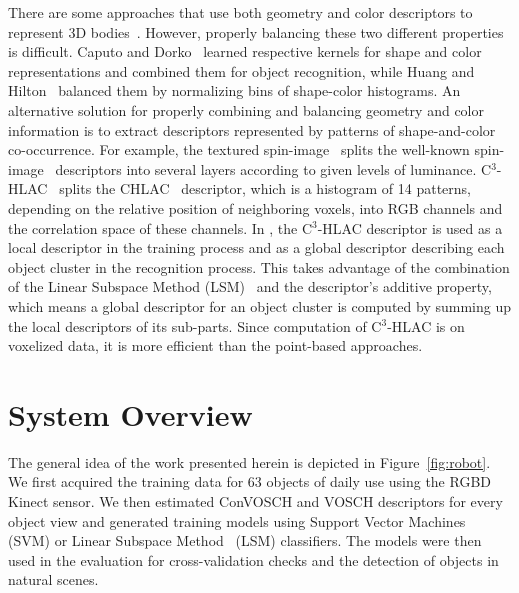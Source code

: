 \documentclass[a4paper, 10 pt, conference]{sty/ieeeconf}
\begin{document}
There are some approaches that use both geometry and color descriptors to
represent 3D bodies~\cite{park2006}. However, properly balancing these two
different properties is difficult.  Caputo and Dorko~\cite{caputo2002} learned
respective kernels for shape and color representations and combined them for
object recognition, while Huang and Hilton~\cite{huang2009} balanced them by
normalizing bins of shape-color histograms.  An alternative solution for properly combining
and balancing geometry and color information is to extract descriptors
represented by patterns of shape-and-color co-occurrence.  For example, the textured
spin-image~\cite{cortelazzo2006} splits the well-known
spin-image~\cite{Johnson_spin_images} descriptors into several layers
according to given levels of luminance. C$^3$-HLAC~\cite{kanezaki2011icra} 
splits the CHLAC~\cite{kobayashi2004} descriptor, which is a histogram of 14 patterns, 
depending on the relative position of neighboring voxels, into RGB channels and the correlation 
space of these channels.  In \cite{kanezaki2011icra}, the C$^3$-HLAC descriptor is used as a local
descriptor in the training process and as a global descriptor describing each
object cluster in the recognition process. This takes advantage of the combination
of the Linear Subspace Method (LSM)~\cite{watanabe1973} and the descriptor's additive property, 
which means a global descriptor for an object cluster is computed by summing up the local descriptors of its sub-parts.
Since computation of C$^3$-HLAC is on voxelized data, it is more efficient
than the point-based approaches. %

\section{System Overview}
\label{sec:overview}
The general idea of the work presented herein is depicted in 
Figure~\ref{fig:robot}. We first acquired the training data for 63 objects
of daily use using the RGBD Kinect sensor. We then estimated ConVOSCH and VOSCH descriptors 
for every object view and generated training models using Support Vector
Machines~\cite{svm99} (SVM) or Linear Subspace Method~\cite{watanabe1973} (LSM) classifiers. The models were then used
in the evaluation for cross-validation checks and the detection of 
objects in natural scenes.
\end{document}
